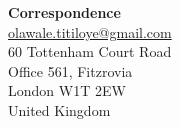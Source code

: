 \documentclass[11pt]{article}
\theoremstyle{definition}
\begin{document}



\par\vfill
\noindent\begin{minipage}{\textwidth}
\small
\textbf{Correspondence}\\
\href{mailto:olawale.titiloye@gmail.com}{olawale.titiloye@gmail.com}\\
60 Tottenham Court Road\\
Office 561, Fitzrovia\\
London W1T 2EW\\
United Kingdom
\end{minipage}
\end{document}
